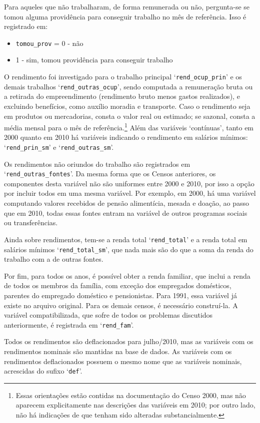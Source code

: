\documentclass[12pt,a4paper]{article}
\newcommand{\vr}[1]{\texttt{#1}}
\begin{document}
Para aqueles que não trabalharam, de forma remunerada ou não, pergunta-se se tomou alguma providência para conseguir trabalho no mês de referência. Isso é registrado em:
\begin{itemize}
  \item \vr{tomou\_prov} = 0 - não
  \item 1 - sim, tomou providência para conseguir trabalho
\end{itemize}

O rendimento foi investigado para o trabalho principal ‘\vr{rend\_ocup\_prin}’ e os demais trabalhos ‘\vr{rend\_outras\_ocup}’, sendo computada a remuneração bruta ou a retirada do empreendimento (rendimento bruto menos gastos realizados), e excluindo benefícios, como auxílio moradia e transporte. Caso o rendimento seja em produtos ou mercadorias, consta o valor real ou estimado; se sazonal, consta a média mensal para o mês de referência.\footnote{Essas orientações estão contidas na documentação do Censo 2000, mas não aparecem explicitamente nas descrições das variáveis em 2010; por outro lado, não há indicações de que tenham sido alteradas substancialmente.} Além das variáveis ‘contínuas’, tanto em 2000 quanto em 2010 há variáveis indicando o rendimento em salários mínimos: ‘\vr{rend\_prin\_sm}’ e ‘\vr{rend\_outras\_sm}’.

Os rendimentos não oriundos do trabalho são registrados em ‘\vr{rend\_outras\_fontes}’. Da mesma forma que os Censos anteriores, os componentes desta variável não são uniformes entre 2000 e 2010, por isso a opção por incluir todos em uma mesma variável. Por exemplo, em 2000, há uma variável computando valores recebidos de pensão alimentícia, mesada e doação, ao passo que em 2010, todas essas fontes entram na variável de outros programas sociais ou transferências.

Ainda sobre rendimentos, tem-se a renda total ‘\vr{rend\_total}’ e a renda total em salários mínimos ‘\vr{rend\_total\_sm}’, que nada mais são do que a soma da renda do trabalho com a de outras fontes.

Por fim, para todos os anos, é possível obter a renda familiar, que inclui a renda de todos os membros da família, com exceção dos empregados domésticos, parentes do empregado doméstico e pensionistas. Para 1991, essa variável já existe no arquivo original. Para os demais censos, é necessário construí-la. A variável compatibilizada, que sofre de todos os problemas discutidos anteriormente, é registrada em ‘\vr{rend\_fam}’.

Todos os rendimentos são deflacionados para julho/2010, mas as variáveis com os rendimentos nominais são mantidas na base de dados. As variáveis com os rendimentos deflacionados possuem o mesmo nome que as variáveis nominais, acrescidas do sufixo ‘\vr{def}’.
\end{document}
